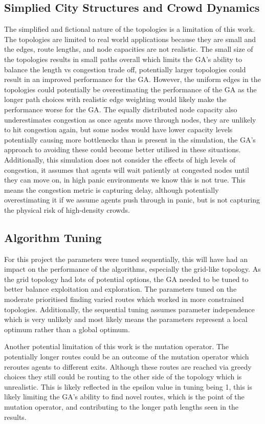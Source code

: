 \documentclass[12pt,a4paper]{report}
\begin{document}
\subsection{Simplied City Structures and Crowd Dynamics}
The simplified and fictional nature of the topologies is a limitation of this work. The topologies are limited to real world applications because they are small and the edges, route lengths, and node capacities are not realistic. The small size of the topologies results in small paths overall which limits the GA's ability to balance the length vs congestion trade off, potentially larger topologies could result in an improved performance for the GA. However, the uniform edges in the topologies could potentially be overestimating the performance of the GA as the longer path choices with realistic edge weighting would likely make the performance worse for the GA. The equally distributed node capacity also underestimates congestion as once agents move through nodes, they are unlikely to hit congestion again, but some nodes would have lower capacity levels potentially causing more bottlenecks than is present in the simulation, the GA’s approach to avoiding these could become better utilised in these situations. Additionally, this simulation does not consider the effects of high levels of congestion, it assumes that agents will wait patiently at congested nodes until they can move on, in high panic environments we know this is not true. This means the congestion metric is capturing delay, although potentially overestimating it if we assume agents push through in panic, but is not capturing the physical risk of high-density crowds.

\subsection{Algorithm Tuning}
For this project the parameters were tuned sequentially, this will have had an impact on the performance of the algorithms, especially the grid-like topology. As the grid topology had lots of potential options, the GA needed to be tuned to better balance exploitation and exploration. The parameters tuned on the moderate prioritised finding varied routes which worked in more constrained topologies. Additionally, the sequential tuning assumes parameter independence which is very unlikely and most likely means the parameters represent a local optimum rather than a global optimum. 

Another potential limitation of this work is the mutation operator. The potentially longer routes could be an outcome of the mutation operator which reroutes agents to different exits. Although these routes are reached via greedy choices they still could be routing to the other side of the topology which is unrealistic. This is likely reflected in the epsilon value in tuning being 1, this is likely limiting the GA’s ability to find novel routes, which is the point of the mutation operator, and contributing to the longer path lengths seen in the results.
\end{document}
